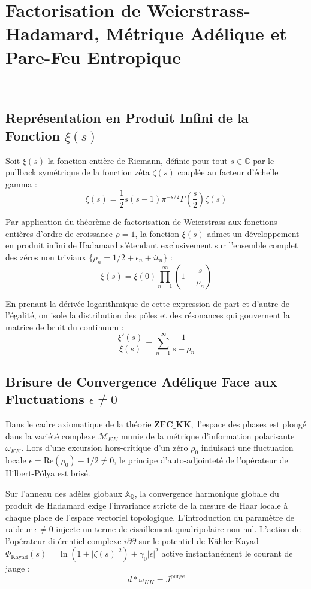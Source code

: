 \chapter{Factorisation de Weierstrass-Hadamard, M{\'e}trique Ad{\'e}lique et Pare-Feu Entropique}
\(\label{ch:hadamard_riemann_final}\)

\section{Repr{\'e}sentation en Produit Infini de la Fonction \(\xi(s)\)}
Soit \(\xi(s)\) la fonction enti{\`e}re de Riemann, d{\'e}finie pour tout \(s \in \mathbb{C}\) par le pullback sym{\'e}trique de la fonction z{\^e}ta \(\zeta(s)\) coupl{\'e}e au  facteur d'{\'e}chelle gamma :
\[\xi(s) = \frac{1}{2} s(s-1) \pi^{-s/2} \Gamma\left(\frac{s}{2}\right) \zeta(s)\]

Par application du th{\'e}or{\`e}me de factorisation de Weierstrass aux fonctions enti{\`e}res d'ordre de croissance \(\rho = 1\), la fonction \(\xi(s)\) admet un d{\'e}veloppement en produit infini de Hadamard s'{\'e}tendant exclusivement sur l'ensemble complet des z{\'e}ros non triviaux \(\{\rho_n = 1/2 + \epsilon_n + it_n\}\) :
\[\xi(s) = \xi(0) \prod_{n=1}^{\infty} \left( 1 - \frac{s}{\rho_n} \right)\]

En prenant la d{\'e}riv{\'e}e logarithmique de cette expression de part et d'autre de l'{\'e}galit{\'e}, on isole la distribution des p{\^o}les et des r{\'e}sonances qui gouvernent la matrice de bruit du continuum :
\[\frac{\xi'(s)}{\xi(s)} = \sum_{n=1}^{\infty} \frac{1}{s - \rho_n}\]

\section{Brisure de Convergence Ad{\'e}lique Face aux Fluctuations \(\epsilon \neq 0\)}
Dans le cadre axiomatique de la th{\'e}orie \(\textbf{ZFC\_KK},\) l'espace des phases est plong{\'e} dans la vari{\'e}t{\'e} complexe \(\mathcal{M}_{KK}\) munie de la m{\'e}trique d'information polarisante \(\omega_{KK}\). Lors d'une excursion hors-critique d'un z{\'e}ro \(\rho_0\) induisant une fluctuation locale \(\epsilon = \text{Re}(\rho_0) - 1/2 \neq 0\), le principe d'auto-adjointet{\'e} de l'op{\'e}rateur de Hilbert-P{\'o}lya est bris{\'e}.

Sur l'anneau des ad{\`e}les globaux $\mathbb{A}_{\mathbb{Q}}$, la convergence harmonique globale du produit de Hadamard exige l'invariance stricte de la mesure de Haar locale {\`a} chaque place de l'espace vectoriel topologique. L'introduction du param{\`e}tre de raideur $\epsilon \neq 0$ injecte un terme de cisaillement quadripolaire non nul. L'action de l'op{\'e}rateur di {\'e}rentiel complexe $i \partial \bar{\partial}$ sur le potentiel de K{\"a}hler-Kayad $\Phi_{\text{Kayad}}(s) = \ln(1 + |\zeta(s)|^2) + \gamma_0 |\epsilon|^2$ active instantan{\'e}ment le courant de jauge :
\[d * \omega_{KK} = J^{\text{purge}}\]

